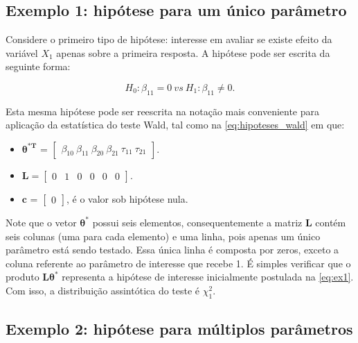 \documentclass[AMA,STIX1COL]{WileyNJD-v2}
\begin{document}
\subsection{Exemplo 1: hipótese para um único parâmetro}

Considere o primeiro tipo de hipótese: interesse em avaliar se existe efeito da variável $X_1$ apenas sobre a primeira resposta. A hipótese pode ser escrita da seguinte forma:

\begin{equation}
\label{eq:ex1}
H_0: \beta_{11} = 0 \ vs \ H_1: \beta_{11} \neq 0.
\end{equation}

Esta mesma hipótese pode ser reescrita na notação mais conveniente para aplicação da estatística do teste Wald, tal como na \autoref{eq:hipoteses_wald} em que:

\begin{itemize}
  
  \item $\boldsymbol{\theta^{*T}}$ = $\begin{bmatrix} \beta_{10} \  \beta_{11} \ \beta_{20} \ \beta_{21} \ \tau_{11} \ \tau_{21} \end{bmatrix}$.

\item $\boldsymbol{L} = \begin{bmatrix} 0 & 1 & 0 & 0 & 0 & 0  \end{bmatrix}.$
 
\item $\boldsymbol{c}$ = $\begin{bmatrix} 0 \end{bmatrix}$, é o valor sob hipótese nula. 
\end{itemize}

Note que o vetor $\boldsymbol{\theta^{*}}$ possui seis elementos, consequentemente a matriz $\boldsymbol{L}$ contém seis colunas (uma para cada elemento) e uma linha, pois apenas um único parâmetro está sendo testado. Essa única linha é composta por zeros, exceto a coluna referente ao parâmetro de interesse que recebe 1. É simples verificar que o produto $\boldsymbol{L}\boldsymbol{\theta^{*}}$ representa a hipótese de interesse inicialmente postulada na \autoref{eq:ex1}. Com isso, a distribuição assintótica do teste é $\chi^2_1$.

\subsection{Exemplo 2: hipótese para múltiplos parâmetros}\label{sec:ex2}
\end{document}

